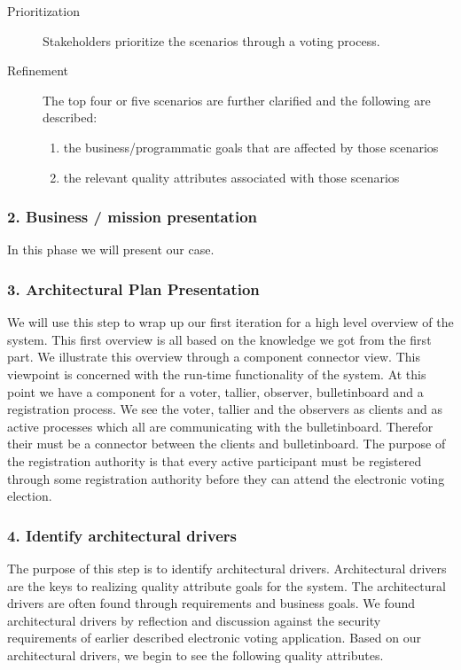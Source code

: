 \begin{description}
    \item [Prioritization] 
  Stakeholders prioritize the scenarios through a voting process. 
    
    \item [Refinement]
        The top four or five scenarios are further clarified and the following are described:
        \begin{enumerate}
            \item the business/programmatic goals that are affected by those scenarios
            \item the relevant quality attributes associated with those scenarios   
        \end{enumerate}

   

\end{description}




\subsubsection{2. Business / mission presentation}
In this phase we will present our case.
 
\subsubsection{3. Architectural Plan Presentation}
We will use this step to wrap up our first iteration for a high level overview of the system. This first overview is all based on the knowledge we got from the first part. We illustrate this overview through a component connector view. This viewpoint is concerned with the run-time functionality of the system.  At this point we have a component for a voter, tallier, observer, bulletinboard and a registration process. We see the voter, tallier and the observers as clients and as active processes which all are communicating with the  bulletinboard. Therefor their must be a connector between the clients and bulletinboard. The purpose of the registration authority is that every active participant must be registered through some registration authority before they can attend the electronic voting election. 

\begin{center}
\end{center}

\subsubsection{4. Identify architectural drivers}
The purpose of this step is to identify architectural drivers. Architectural drivers are the keys to realizing quality attribute goals for the system. The architectural drivers are often found through requirements and business goals. We found architectural drivers by reflection and discussion against the security requirements of earlier described electronic voting application. Based on our architectural drivers, we begin to see the following quality attributes.\\


